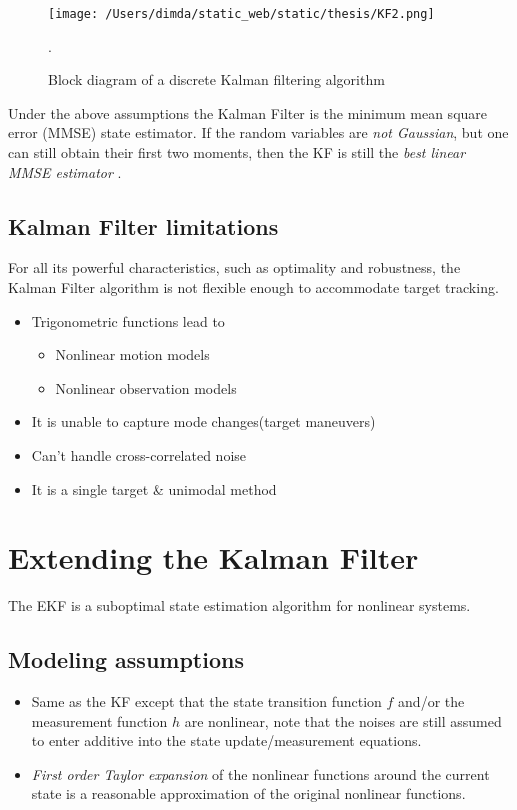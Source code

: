 \begin{figure}[H]
	\centering
	\texttt{[image: /Users/dimda/static\_web/static/thesis/KF2.png]}
	\caption{Block diagram of a discrete Kalman filtering algorithm}.
	\label{fig:state_vector}
\end{figure}


Under the above assumptions the Kalman Filter is the minimum mean square error (MMSE) state estimator. If the random variables are \emph{not Gaussian}, but one can still obtain their first two moments, then the KF is still the \emph{best linear MMSE estimator} \cite{Shalom1995}.

\subsection{Kalman Filter limitations}

For all its powerful characteristics, such as optimality and robustness, the Kalman Filter algorithm is not flexible enough to accommodate target tracking\cite{Shalom1995}.

\begin{itemize}
	\item Trigonometric functions lead to
		\begin{itemize}
			\item Nonlinear motion models
			\item Nonlinear observation models
		\end{itemize}
	\item It is unable to capture mode changes(target maneuvers)
	\item Can't handle cross-correlated noise
	\item It is a single target & unimodal method
\end{itemize}

\section{Extending the Kalman Filter}

The EKF is a suboptimal state estimation algorithm for nonlinear systems.

\subsection{Modeling assumptions}

\begin{itemize}
	\item Same as the KF except that the state transition function $f$ and/or the measurement function $h$ are nonlinear, note that the noises are still assumed to enter additive into the state update/measurement equations.
	\item \emph{First order Taylor expansion} of the nonlinear functions around the current state is a reasonable approximation of the original nonlinear functions.
\end{itemize}

